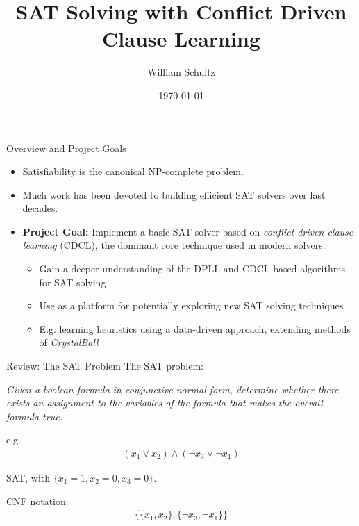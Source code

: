 \documentclass{beamer}
\title{SAT Solving with Conflict Driven Clause Learning}
\author{William Schultz}
\institute{CS 7240 Final Project}
\date{\today}
\begin{document}
\newcommand{\green}[1]{\textcolor{green}{#1}}
\newcommand{\red}[1]{\textcolor{red}{#1}}

\begin{frame}
    \titlepage
\end{frame}

\begin{frame}{Overview and Project Goals}
\begin{itemize}
    \item Satisfiability is the canonical NP-complete problem.
    
    \item Much work has been devoted to building efficient SAT solvers over last decades.\\
    
    \item \textbf{Project Goal:} Implement a basic SAT solver based on \textit{conflict driven clause learning} (CDCL), the dominant core technique used in modern solvers.
    \begin{itemize}
        \item Gain a deeper understanding of the DPLL and CDCL based algorithms for SAT solving
        \item Use as a platform for potentially exploring new SAT solving techniques 
        \item E.g. learning heuristics using a data-driven approach, extending methods of \textit{CrystalBall} \cite{2019sooscrystalball}
    \end{itemize}
\end{itemize}
\end{frame}

\begin{frame}{Review: The SAT Problem}
    The SAT problem:
    \vspace{12pt}

    \textit{Given a boolean formula in conjunctive normal form, determine whether there exists an assignment to the variables of the formula that makes the overall formula true.}

    \pause
    \vspace{12pt}
    e.g.
    \begin{align*}
        (x_1 \vee x_2) \wedge (\neg x_3 \vee \neg x_1)
    \end{align*}
    \pause
    \begin{center}
        SAT, with $\{x_1=1,x_2=0,x_3=0\}$. 
    \end{center}
    \pause
    CNF notation:
    \begin{align*}
        \{\{x_1, x_2\}, \{\neg x_3, \neg x_1\}\}
    \end{align*}
\end{frame}
\end{document}
